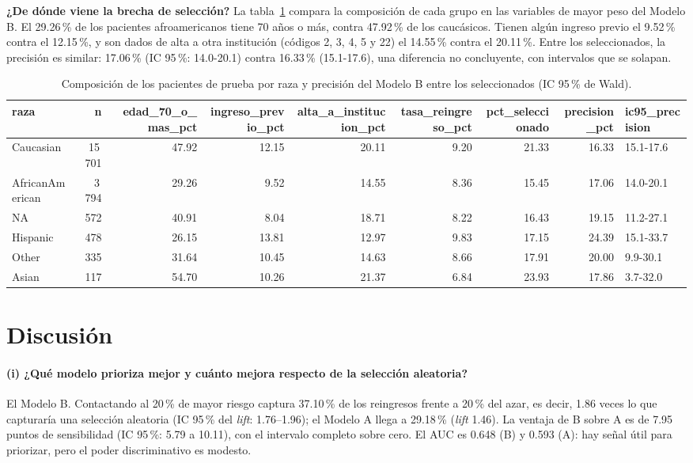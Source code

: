\documentclass[11pt,a4paper]{article}
\newenvironment{tablaentex}[2]{%
  \begin{table}[H]\centering\small\caption{#1}\label{#2}\begin{adjustbox}{max width=\textwidth}}%
  {\end{adjustbox}\end{table}}
\begin{document}
\textbf{¿De dónde viene la brecha de selección?} La tabla~\ref{tab:eqcomp} compara la composición de cada grupo en las variables de mayor peso del Modelo B. El 29.26\,\% de los pacientes afroamericanos tiene 70 años o más, contra 47.92\,\% de los caucásicos. Tienen algún ingreso previo el 9.52\,\% contra el 12.15\,\%, y son dados de alta a otra institución (códigos 2, 3, 4, 5 y 22) el 14.55\,\% contra el 20.11\,\%. Entre los seleccionados, la precisión es similar: 17.06\,\% (IC 95\,\%: 14.0-20.1) contra 16.33\,\% (15.1-17.6), una diferencia no concluyente, con intervalos que se solapan.
\begin{tablaentex}{Composición de los pacientes de prueba por raza y precisión del Modelo B entre los seleccionados (IC 95\,\% de Wald).}{tab:eqcomp}
\begin{tabular}{lrrrrrrrl}
\toprule
raza & n & edad\_70\_o\_mas\_pct & ingreso\_previo\_pct & alta\_a\_institucion\_pct & tasa\_reingreso\_pct & pct\_seleccionado & precision\_pct & ic95\_precision \\
\midrule
Caucasian & 15\,701 & 47.92 & 12.15 & 20.11 & 9.20 & 21.33 & 16.33 & 15.1-17.6 \\
AfricanAmerican & 3\,794 & 29.26 & 9.52 & 14.55 & 8.36 & 15.45 & 17.06 & 14.0-20.1 \\
NA & 572 & 40.91 & 8.04 & 18.71 & 8.22 & 16.43 & 19.15 & 11.2-27.1 \\
Hispanic & 478 & 26.15 & 13.81 & 12.97 & 9.83 & 17.15 & 24.39 & 15.1-33.7 \\
Other & 335 & 31.64 & 10.45 & 14.63 & 8.66 & 17.91 & 20.00 & 9.9-30.1 \\
Asian & 117 & 54.70 & 10.26 & 21.37 & 6.84 & 23.93 & 17.86 & 3.7-32.0 \\
\bottomrule
\end{tabular}
\end{tablaentex}

\section{Discusión}\label{sec:disc}
\paragraph{(i) ¿Qué modelo prioriza mejor y cuánto mejora respecto de la selección aleatoria?}
El Modelo B. Contactando al 20\,\% de mayor riesgo captura 37.10\,\% de los reingresos frente a 20\,\% del azar, es decir, 1.86 veces lo que capturaría una selección aleatoria (IC 95\,\% del \emph{lift}: 1.76--1.96); el Modelo A llega a 29.18\,\% (\emph{lift} 1.46). La ventaja de B sobre A es de 7.95 puntos de sensibilidad (IC 95\,\%: 5.79 a 10.11), con el intervalo completo sobre cero. El AUC es 0.648 (B) y 0.593 (A): hay señal útil para priorizar, pero el poder discriminativo es modesto.
\end{document}
